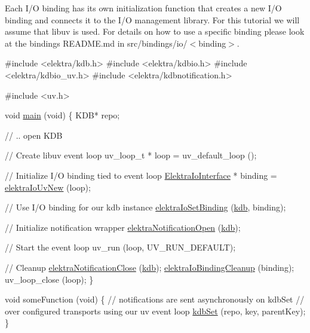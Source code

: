 Each I/O binding has its own initialization function that creates a new I/O binding and connects it to the I/O management library. For this tutorial we will assume that libuv is used. For details on how to use a specific binding please look at the bindings\textquotesingle{} R\+E\+A\+D\+M\+E.\+md in {\ttfamily src/bindings/io/$<$binding$>$}.


\begin{DoxyCode}
\textcolor{preprocessor}{#include <elektra/kdb.h>}
\textcolor{preprocessor}{#include <elektra/kdbio.h>}
\textcolor{preprocessor}{#include <elektra/kdbio\_uv.h>}
\textcolor{preprocessor}{#include <elektra/kdbnotification.h>}

\textcolor{preprocessor}{#include <uv.h>}

\textcolor{keywordtype}{void} \hyperlink{testio__doc_8c_a3c04138a5bfe5d72780bb7e82a18e627}{main} (\textcolor{keywordtype}{void})
\{
        KDB* repo;

        \textcolor{comment}{// .. open KDB}

        \textcolor{comment}{// Create libuv event loop}
        uv\_loop\_t * loop = uv\_default\_loop ();

        \textcolor{comment}{// Initialize I/O binding tied to event loop}
        \hyperlink{kdbio_8h_aabcd87b8c09d4d4c1033fc1baa417391}{ElektraIoInterface} * binding = \hyperlink{kdbio__uv_8h_a45e8a50dca7d8097bc2c38c54b49958b}{elektraIoUvNew} (loop);

  \textcolor{comment}{// Use I/O binding for our kdb instance}
  \hyperlink{group__kdbio_ga187345483bdfbb404919c6797bc2db77}{elektraIoSetBinding} (\hyperlink{namespacekdb}{kdb}, binding);

        \textcolor{comment}{// Initialize notification wrapper}
        \hyperlink{notification_8c_aeae96154abdb5fdbf1b34a01e2b23e44}{elektraNotificationOpen} (\hyperlink{namespacekdb}{kdb});

        \textcolor{comment}{// Start the event loop}
        uv\_run (loop, UV\_RUN\_DEFAULT);

        \textcolor{comment}{// Cleanup}
  \hyperlink{notification_8c_a5685dafbd4131011365628d6d9213594}{elektraNotificationClose} (\hyperlink{namespacekdb}{kdb});
  \hyperlink{io_8c_a062e9d7d5305201dfe5ba437f3f03224}{elektraIoBindingCleanup} (binding);
        uv\_loop\_close (loop);
\}

\textcolor{keywordtype}{void} someFunction (\textcolor{keywordtype}{void})
\{
        \textcolor{comment}{// notifications are sent asynchronously on kdbSet}
        \textcolor{comment}{// over configured transports using our uv event loop}
        \hyperlink{group__kdb_ga11436b058408f83d303ca5e996832bcf}{kdbSet} (repo, key, parentKey);
\}
\end{DoxyCode}


